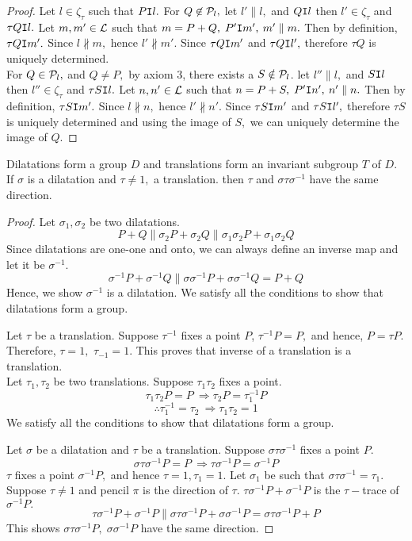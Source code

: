 \begin{proof}
    Let $l \in \zeta_\tau$ such that $P \texttt{I} l.$ For $Q \not \in \mathcal{P}_l,$ let $l' \parallel l,$ and $Q \texttt{I} l$ then $l' \in \zeta_\tau$ and $\tau Q \texttt{I} l.$  Let $m,m' \in \mathcal{L}$ such that $m=P+Q, \; P' \texttt{I} m', \: m' \parallel m.$ Then by definition, $ \tau Q \texttt{I} m'.$ Since $l \not \parallel m,$ hence $l' \not \parallel m'$. Since $\tau Q \texttt{I} m'$ and $\tau Q \texttt{I} l',$ therefore $\tau Q$ is uniquely determined. \\
    For $Q \in \mathcal{P}_l,$ and $Q \neq P,$ by axiom 3, there exists a $S \notin \mathcal{P}_{l}$. let $l'' \parallel l,$ and $S \texttt{I} l$ then $l'' \in \zeta_\tau$ and $\tau S \texttt{I} l.$  Let $n,n' \in \mathcal{L}$ such that $n=P+S, \; P' \texttt{I} n', \: n' \parallel n.$ Then by definition, $ \tau S \texttt{I} m'.$ Since $l \not \parallel n,$ hence $l' \not \parallel n'$. Since $\tau S \texttt{I} m'$ and $\tau S \texttt{I} l',$ therefore $\tau S$ is uniquely determined and using the image of $S,$ we can uniquely determine the image of $Q$. 
\end{proof}

\begin{theorem}
    Dilatations form a group $D$ and translations form an invariant subgroup $T$ of $D$. If $\sigma$ is a dilatation and $\tau \neq 1,$ a translation. then $\tau$ and $\sigma \tau \sigma^{-1}$ have the same direction.
\end{theorem}
\begin{proof}
    Let $\sigma_1, \sigma_2$ be two dilatations. 
    \[ P+Q \parallel \sigma_2 P + \sigma_2 Q \parallel \sigma_1 \sigma_2 P+ \sigma_1 \sigma_2 Q \]
    Since dilatations are one-one and onto, we can always define an inverse map and let it be $\sigma^{-1}$. 
    \[ \sigma^{-1}P+\sigma^{-1}Q \parallel \sigma\sigma^{-1}P+\sigma\sigma^{-1}Q = P+Q \]
    Hence, we show $\sigma^{-1}$ is a dilatation.
    We satisfy all the conditions to show that dilatations form a group.

    Let $\tau$ be a translation. Suppose $\tau^{-1}$ fixes a point $P$, $\tau^{-1}P=P,$ and hence, $P=\tau P.$ Therefore, $\tau = 1,$ $\tau_{-1}=1. $ This proves that inverse of a translation is a translation. \\
    Let $\tau_1, \tau_2$ be two translations. Suppose $\tau_1 \tau_2$ fixes a point.     \[ \tau_1 \tau_2 P=P \: \Rightarrow \tau_2 P= \tau_1^{-1}P \]   \[ \therefore \tau_1^{-1} =\tau_2 \: \Rightarrow \tau_1 \tau_2=1 \]
    We satisfy all the conditions to show that dilatations form a group.

    Let $\sigma$ be a dilatation and $\tau$ be a translation. Suppose $\sigma \tau \sigma^{-1}$ fixes a point $P.$
    \[ \sigma \tau \sigma^{-1}P=P \: \Rightarrow \tau \sigma^{-1}P=\sigma^{-1}P \]
    $\tau$ fixes a point $\sigma^{-1}P,$ and hence $\tau=1, \tau_1=1.$ Let $\sigma_1$ be such that $\sigma \tau \sigma^{-1}=\tau_1.$ Suppose $\tau \neq 1$ and pencil $\pi$ is the direction of $\tau.$ $\tau \sigma^{-1}P+\sigma^{-1}P$ is the $\tau-$trace of $\sigma^{-1}P.$    \[ \tau \sigma^{-1}P+\sigma^{-1}P \parallel \sigma \tau \sigma^{-1}P+ \sigma \sigma^{-1}P = \sigma \tau \sigma^{-1}P+ P \]
    This shows $\sigma \tau \sigma^{-1}P, \; \sigma \sigma^{-1}P$ have the same direction.
    
\end{proof}

